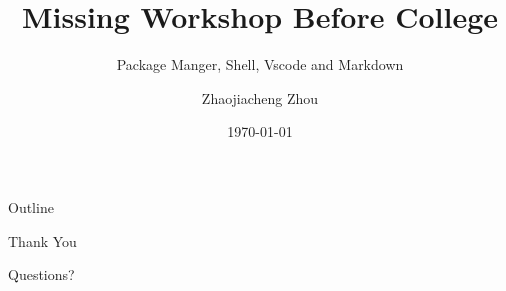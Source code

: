 \documentclass[10pt, colorlinks]{beamer}
\title{Missing Workshop Before College}
\subtitle{Package Manger, Shell, Vscode and Markdown}
\author{Zhaojiacheng Zhou}
\date{\today}
\institute{TechJI}
\begin{document}
\frame{\titlepage}

\begin{frame}{Outline}
 \tableofcontents
\end{frame}









\begin{frame}{Thank You}
  \begin{center}
    {\Huge Questions?}
  \end{center}
\end{frame}
\end{document}
